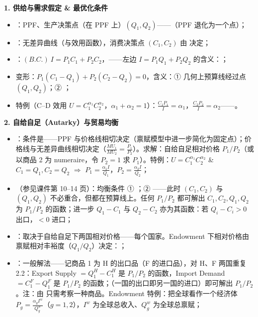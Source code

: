 \begin{mapbox}
\textbf{1. 供给与需求假定 \& 最优化条件}
\begin{itemize}
  \item {}：PPF、生产决策点（在 PPF 上）$(Q_1, Q_2)$——（PPF 退化为一个点）；
  \item {}：无差异曲线（与效用函数），消费决策点 $(C_1, C_2)$ 由 决定；
  \item {}：$(B.C.)\ I = P_1 C_1 + P_2 C_2$，——左边 $I = P_1 Q_1 + P_2 Q_2$ 的含义：；
  \item 变形：$P_1 (C_1 - Q_1) + P_2 (C_2 - Q_2) = 0$，含义：① 几何上预算线经过点 $(Q_1, Q_2)$；② ；
  \item 特例（C--D 效用 $U = C_1^{\alpha_1} C_2^{\alpha_2}$，$\alpha_1 + \alpha_2 = 1$）：$\frac{C_1 P_1}{I} = \alpha_1$，$\frac{C_2 P_2}{I} = \alpha_2$——。
\end{itemize}
\textbf{2. 自给自足（Autarky）与贸易均衡}
\begin{itemize}
  \item {}：条件是——PPF 与价格线相切决定（禀赋模型中进一步简化为固定点）；价格线与无差异曲线相切决定（$\frac{MU_1}{MU_2} = \frac{P_1}{P_2}$）。求解：自给自足相对价格 $P_1/P_2$（或以商品 2 为 numeraire，令 $P_2 = 1$ 求 $P_1$）。特例：$U = C_1^{\alpha_1} C_2^{\alpha_2}$ \& $C_1 = Q_1, C_2 = Q_2$ $\Rightarrow$ $P_1 = \frac{\alpha_1 I}{Q_1}$，$P_2 = \frac{\alpha_2 I}{Q_2}$；
  \item {}（参见课件第 10--14 页）：均衡条件 ① ；② ——此时 $(C_1, C_2)$ 与 $(Q_1, Q_2)$ 不必重合，但都在预算线上。任何 $P_1/P_2$ 都可解出 $C_1, C_2, Q_1, Q_2$ 为 $P_1/P_2$ 的函数；进一步 $Q_1 - C_1$ 与 $Q_2 - C_2$ 亦为其函数：若 $Q_i - C_i > 0$ 出口，$< 0$ 进口；
  \item {}：取决于自给自足下两国相对价格——每个国家。Endowment 下相对价格由禀赋相对丰裕度（$Q_1/Q_2$）决定：；
  \item {}：一般解法——记商品 1 为 H 的出口品（F 的进口品），对 H、F 两国重复 2.2：Export Supply $= Q_1^H - C_1^H$ 是 $P_1/P_2$ 的函数，Import Demand $= C_1^F - Q_1^F$ 是 $P_1/P_2$ 的函数；（一国的出口即另一国的进口）即可解出 $P_1/P_2$。注：由 只需考察一种商品。Endowment 特例：把全球看作一个经济体 $P_g = \frac{\alpha_g I^w}{Q_g^w}$（$g = 1, 2$），$I^w$ 为全球总收入、$Q_g^w$ 为全球总禀赋；

\end{itemize}
\end{mapbox}
